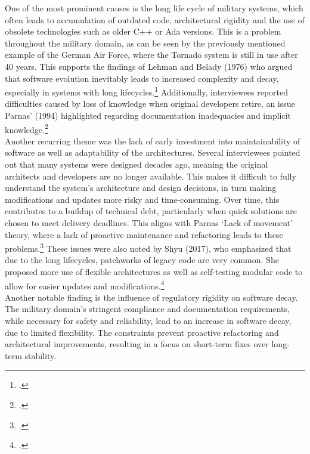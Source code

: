 One of the most prominent causes is the long life cycle of military systems, which often leads to accumulation of outdated code, architectural rigidity and the use of obsolete technologies such as older C++ or Ada versions.
This is a problem throughout the military domain, as can be seen by the previously mentioned example of the German Air Force, where the Tornado system is still in use after 40 years.
This supports the findings of Lehman and Belady (1976) who argued that software evolution inevitably leads to increased complexity and decay, especially in systems with long lifecycles.\footcite[228]{beladyModelLargeProgram1976}
Additionally, interviewees reported difficulties caused by loss of knowledge when original developers retire, an issue Parnas' (1994) highlighted regarding documentation inadequacies and implicit knowledge.\footcite[280-281]{296790}\\

Another recurring theme was the lack of early investment into maintainability of software as well as adaptability of the architectures. Several interviewees pointed out that many systems were designed decades ago, meaning the original architects and developers are no longer available.
This makes it difficult to fully understand the system's architecture and design decisions, in turn making modifications and updates more risky and time-consuming. 
Over time, this contributes to a buildup of technical debt, particularly when quick solutions are chosen to meet delivery deadlines.
This aligns with Parnas `Lack of movement' theory, where a lack of proactive maintenance and refactoring leads to these problems.\footcite[280]{296790}
These issues were also noted by Shyu (2017), who emphasized that due to the long lifecycles, patchworks of legacy code are very common. She proposed more use of flexible architectures as well as self-testing modular code to allow for easier updates and modifications.\footcite[15-17]{shyu2017military}\\

Another notable finding is the influence of regulatory rigidity on software decay. The military domain's stringent compliance and documentation requirements, while necessary for safety and reliability, lead to an increase in software decay, due to limited flexibility.
The constraints prevent proactive refactoring and architectural improvements, resulting in a focus on short-term fixes over long-term stability.

